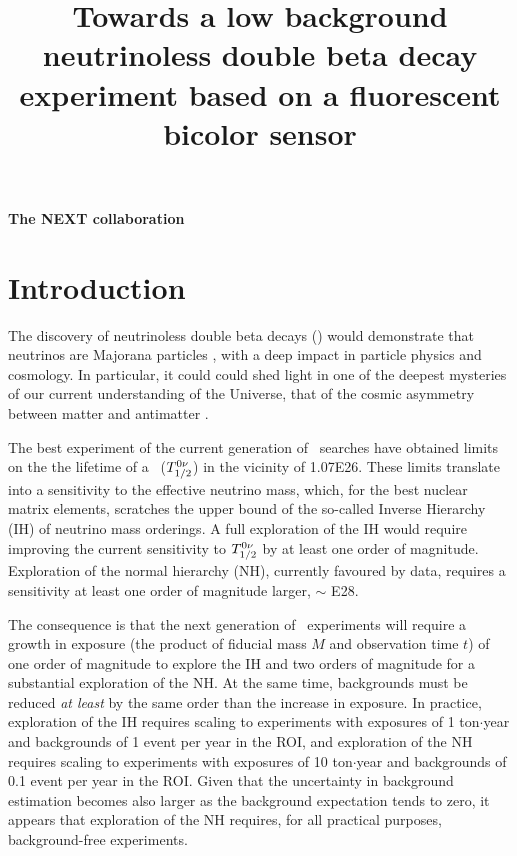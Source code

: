 \documentclass[a4paper,11pt]{article}
\begin{document}
\title{Towards a low background neutrinoless double beta decay experiment based on a fluorescent bicolor sensor}

%

%

\notoctrue
\maketitle
\notoc

\begin{center}
\Large
\textbf{\centering The NEXT collaboration} \\ 

\end{center}


\section{Introduction}
The discovery of neutrinoless double beta decays (\bbonu) would demonstrate that neutrinos are Majorana particles \cite{Majorana:1937}, with a deep impact in particle physics and cosmology. In particular, it could could shed light in one of the deepest mysteries of our current understanding of the Universe, that of the cosmic asymmetry between matter and antimatter \cite{Sakharov1967}. 

The best experiment of the current generation of \bbonu\ searches have obtained limits
on the the lifetime of a \bbonu\ ($T_{1/2}^{0\nu}$) in the vicinity of \SI{1.07E26}{\yr}. These limits translate into a sensitivity to the effective neutrino mass, which, for the best nuclear matrix elements, scratches the upper bound of the so-called Inverse Hierarchy (IH) of neutrino mass orderings. A full exploration of the IH would require improving the current sensitivity to $T_{1/2}^{0\nu}$ by at least one order of magnitude. Exploration of the normal hierarchy (NH), currently favoured by data, requires a sensitivity at least one order of magnitude larger, 
\Tonu $\sim$ \SI{E28}{\yr}.

The consequence is that the next generation of \bbonu\ experiments will require a growth in exposure (the product of fiducial mass $M$ and observation time $t$) of one order of magnitude to explore the IH and two orders of magnitude for a substantial exploration of the NH.  At the same time, backgrounds must be reduced {\it at least} by the same order than the increase in exposure. In practice, exploration of the IH requires scaling to experiments with exposures of 1 ton$\cdot$year and backgrounds of 1 event per year in the ROI, and exploration of the NH requires scaling to experiments with exposures of 10 ton$\cdot$year and backgrounds of 0.1 event per year in the ROI. Given that the uncertainty in background estimation becomes also larger as the background expectation tends to zero, it appears that exploration of the NH requires, for all practical purposes, background-free experiments. 
\end{document}
